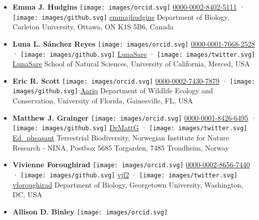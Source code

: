 \begin{itemize}
\item
  \textbf{Emma J. Hudgins}
  \texttt{[image: images/orcid.svg]}
  \href{https://orcid.org/0000-0002-8402-5111}{0000-0002-8402-5111}
  · \texttt{[image: images/github.svg]}
  \href{https://github.com/emmajhudgins}{emmajhudgins}
  Department of Biology, Carleton University, Ottawa, ON K1S 5B6, Canada
\item
  \textbf{Luna L. Sánchez Reyes}
  \texttt{[image: images/orcid.svg]}
  \href{https://orcid.org/0000-0001-7668-2528}{0000-0001-7668-2528}
  · \texttt{[image: images/github.svg]}
  \href{https://github.com/LunaSare}{LunaSare}
  · \texttt{[image: images/twitter.svg]}
  \href{https://twitter.com/LunaSare}{LunaSare}
  School of Natural Sciences, University of California, Merced, USA
\item
  \textbf{Eric R. Scott}
  \texttt{[image: images/orcid.svg]}
  \href{https://orcid.org/0000-0002-7430-7879}{0000-0002-7430-7879}
  · \texttt{[image: images/github.svg]}
  \href{https://github.com/Aariq}{Aariq}
  Department of Wildlife Ecology and Conservation, University of Florida, Gainesville, FL, USA
\item
  \textbf{Matthew J. Grainger}
  \texttt{[image: images/orcid.svg]}
  \href{https://orcid.org/0000-0001-8426-6495}{0000-0001-8426-6495}
  · \texttt{[image: images/github.svg]}
  \href{https://github.com/DrMattG}{DrMattG}
  · \texttt{[image: images/twitter.svg]}
  \href{https://twitter.com/Ed_pheasant}{Ed\_pheasant}
  Terrestrial Biodiversity, Norwegian Institute for Nature Research - NINA, Postbox 5685 Torgarden, 7485 Trondheim, Norway
\item
  \textbf{Vivienne Foroughirad}
  \texttt{[image: images/orcid.svg]}
  \href{https://orcid.org/0000-0002-8656-7440}{0000-0002-8656-7440}
  · \texttt{[image: images/github.svg]}
  \href{https://github.com/vjf2}{vjf2}
  · \texttt{[image: images/twitter.svg]}
  \href{https://twitter.com/vforoughirad}{vforoughirad}
  Department of Biology, Georgetown University, Washington, DC, USA
\item
  \textbf{Allison D. Binley}
  \texttt{[image: images/orcid.svg]}

\end{itemize}
